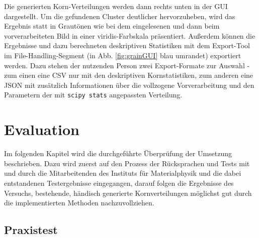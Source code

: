 \documentclass[
  12pt,
  openany]{book}
\begin{document}
Die generierten Korn-Verteilungen werden dann rechts unten in der GUI dargestellt. Um die gefundenen Cluster deutlicher hervorzuheben, wird das Ergebnis statt in Grautönen wie bei dem eingelesenen und dann beim vorverarbeiteten Bild in einer viridis-Farbskala präsentiert. Außerdem können die Ergebnisse und dazu berechneten deskriptiven Statistiken mit dem Export-Tool im File-Handling-Segment (in Abb. \ref{fig:grainGUI} blau umrandet) exportiert werden. Dazu stehen der nutzenden Person zwei Export-Formate zur Auswahl - zum einen eine CSV nur mit den deskriptiven Kornstatistiken, zum anderen eine JSON mit zusätzlich Informationen über die vollzogene Vorverarbeitung und den Parametern der mit \texttt{scipy\ stats} angepassten Verteilung.

\hypertarget{evaluation}{%
\chapter{Evaluation}\label{evaluation}}

Im folgenden Kapitel wird die durchgeführte Überprüfung der Umsetzung beschrieben.
Dazu wird zuerst auf den Prozess der Rücksprachen und Tests mit und durch die Mitarbeitenden des Instituts für Materialphysik und die dabei entstandenen Testergebnisse eingegangen, darauf folgen die Ergebnisse des Versuchs, bestehende, händisch generierte Kornverteilungen möglichst gut durch die implementierten Methoden nachzuvollziehen.

\hypertarget{praxistest}{%
\section{Praxistest}\label{praxistest}}
\end{document}
